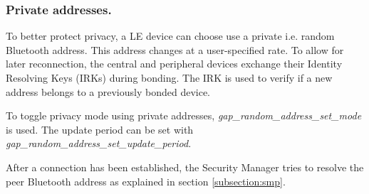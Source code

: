 

\subsubsection{Private addresses.}
To better protect privacy, a LE device can choose use a private i.e. random Bluetooth address. This address changes at a user-specified rate. To allow for later reconnection, the central and peripheral devices exchange their Identity Resolving Keys (IRKs) during bonding. The IRK is used to verify if a new address belongs to a previously bonded device. 

To toggle privacy mode using private addresses, \emph{gap\_random\_address\_set\_mode} is used. The update period can be set with \emph{gap\_random\_address\_set\_update\_period}.

After a connection has been established, the Security Manager tries to resolve the peer Bluetooth address as explained in section \ref{subsection:smp}.

